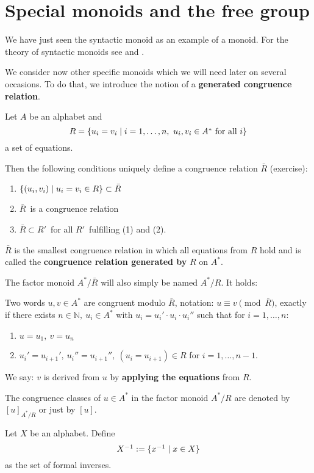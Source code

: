 \section{Special monoids and the free group}

We have just seen the syntactic monoid as an example of a monoid. For the theory
of syntactic monoids see \cite{Salomaa} and \cite{Perrot}.

We consider now other specific monoids which we will need later on several
occasions. To do that, we introduce the notion of a {\bf generated congruence
relation}.

Let $A$ be an alphabet and
\[ R = \mbox{$\{u_i = v_i \mid i = 1, \ldots, n,\ u_i, v_i \in A^*\text{ for all
$i$}\}$} \] 
a set of equations.

Then the following conditions uniquely define a congruence relation $\bar{R}$
 (exercise):
\begin{enumerate}
  \item $\mbox{$\{(u_i, v_i) \mid u_i = v_i \in R\}$} \subset \bar{R}$
  \item $\bar{R}$\ is a congruence relation
  \item $\bar{R} \subset R'$\ for all $R'$\ fulfilling (1) and (2).
\end{enumerate}

$\bar{R}$ is the smallest congruence relation in which all equations from $R$
hold and is called the {\bf congruence relation generated by} $R$ on $A^*$.

The factor monoid $A^*/\bar{R}$ will also simply be named $A^*/R$. It holds:

Two words $u, v \in A^*$ are congruent modulo $\bar{R}$, notation: $u
\equiv v \pmod{\bar{R}}$, exactly if there exists $n \in \mathbb{N},\ u_i \in
A^*$ with $u_i = u_i' \cdot u_i \cdot u_i''$ such that for $i = 1, \ldots, n$:
\begin{enumerate}
  \item $u = u_1,\ v = u_n$
  \item $u_i' = u_{i+1}',\ u_{i}'' = u_{i+1}'',\ (u_{i} = u_{i+1}) \in R$ 
  for $i = 1, \ldots, n-1$.
\end{enumerate}

We say: $v$ is derived from $u$ by {\bf applying the equations} from $R$.

The congruence classes of $u \in A^*$ in the factor monoid $A^*/R$ are denoted
by $[u]_{A^*/R}$ or just by $[u]$.

\begin{definition}
Let $X$ be an alphabet. Define 
\[ \mbox{${X}^{-1}$} := \mbox{$\{\mbox{${x}^{-1}$} \mid x \in X\}$} \]
as the set of formal inverses.
\end{definition}

